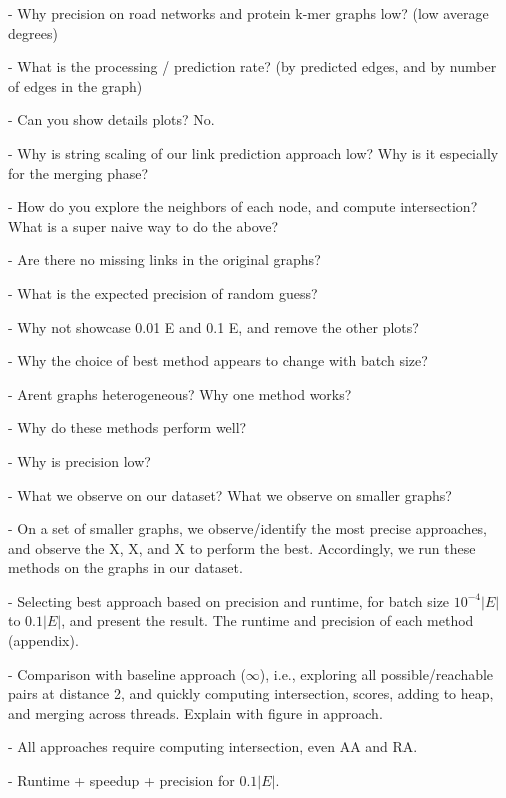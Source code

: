 - Why precision on road networks and protein k-mer graphs low? (low average degrees)

- What is the processing / prediction rate? (by predicted edges, and by number of edges in the graph)

- Can you show details plots? No.

- Why is string scaling of our link prediction approach low? Why is it especially for the merging phase?

- How do you explore the neighbors of each node, and compute intersection? What is a super naive way to do the above?

- Are there no missing links in the original graphs?

- What is the expected precision of random guess?

- Why not showcase 0.01 E and 0.1 E, and remove the other plots?

- Why the choice of best method appears to change with batch size?

- Arent graphs heterogeneous? Why one method works?

- Why do these methods perform well?

- Why is precision low?

- What we observe on our dataset? What we observe on smaller graphs?

- On a set of smaller graphs, we observe/identify the most precise approaches, and observe the X, X, and X to perform the best. Accordingly, we run these methods on the graphs in our dataset.

- Selecting best approach based on precision and runtime, for batch size $10^{-4}|E|$ to $0.1|E|$, and present the result. The runtime and precision of each method (appendix).

- Comparison with baseline approach ($\infty$), i.e., exploring all possible/reachable pairs at distance 2, and quickly computing intersection, scores, adding to heap, and merging across threads. Explain with figure in approach.

- All approaches require computing intersection, even AA and RA.

- Runtime + speedup + precision for $0.1|E|$.
